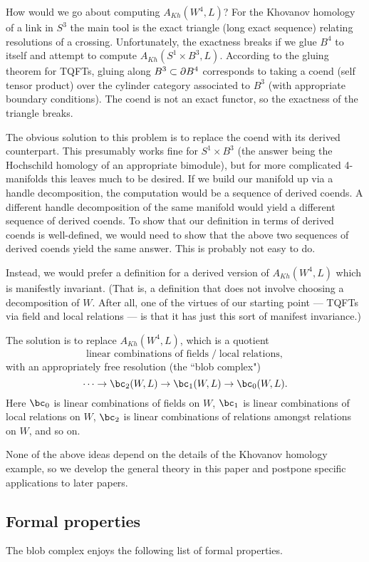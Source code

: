 How would we go about computing $A_{Kh}(W^4, L)$?
For the Khovanov homology of a link in $S^3$ the main tool is the exact triangle (long exact sequence)
relating resolutions of a crossing.
Unfortunately, the exactness breaks if we glue $B^4$ to itself and attempt
to compute $A_{Kh}(S^1\times B^3, L)$.
According to the gluing theorem for TQFTs, gluing along $B^3 \subset \partial B^4$
corresponds to taking a coend (self tensor product) over the cylinder category
associated to $B^3$ (with appropriate boundary conditions).
The coend is not an exact functor, so the exactness of the triangle breaks.


The obvious solution to this problem is to replace the coend with its derived counterpart.
This presumably works fine for $S^1\times B^3$ (the answer being the Hochschild homology
of an appropriate bimodule), but for more complicated 4-manifolds this leaves much to be desired.
If we build our manifold up via a handle decomposition, the computation
would be a sequence of derived coends.
A different handle decomposition of the same manifold would yield a different
sequence of derived coends.
To show that our definition in terms of derived coends is well-defined, we
would need to show that the above two sequences of derived coends yield the same answer.
This is probably not easy to do.

Instead, we would prefer a definition for a derived version of $A_{Kh}(W^4, L)$
which is manifestly invariant.
(That is, a definition that does not
involve choosing a decomposition of $W$.
After all, one of the virtues of our starting point --- TQFTs via field and local relations ---
is that it has just this sort of manifest invariance.)

The solution is to replace $A_{Kh}(W^4, L)$, which is a quotient
\[
 \text{linear combinations of fields} \;\big/\; \text{local relations} ,
\]
with an appropriately free resolution (the ``blob complex")
\[
	\cdots\to \bc_2(W, L) \to \bc_1(W, L) \to \bc_0(W, L) .
\]
Here $\bc_0$ is linear combinations of fields on $W$,
$\bc_1$ is linear combinations of local relations on $W$,
$\bc_2$ is linear combinations of relations amongst relations on $W$,
and so on.

None of the above ideas depend on the details of the Khovanov homology example,
so we develop the general theory in this paper and postpone specific applications
to later papers.



\subsection{Formal properties}
\label{sec:properties}
The blob complex enjoys the following list of formal properties.

